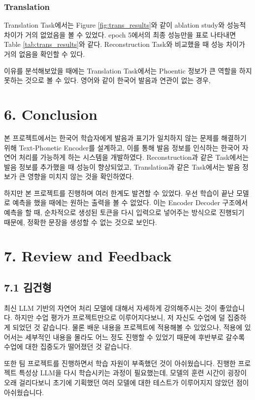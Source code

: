 \documentclass[letterpaper]{article} %
\begin{document}
\subsubsection{Translation}

Translation Task에서는 Figure \ref{fig:trans_results}와 같이 ablation study와 성능적 차이가 거의 없었음을 볼 수 있었다. epoch 5에서의 최종 성능만을 표로 나타내면 Table \ref{tab:trans_results}와 같다. Reconstruction Task와 비교했을 때 성능 차이가 거의 없음을 확인할 수 있다.

이유를 분석해보았을 때에는 Translation Task에서는 Phoentic 정보가 큰 역할을 하지 못하는 것으로 볼 수 있다.
영어와 같이 한국어 발음과 연관이 없는 경우, 



\section{6. Conclusion}
본 프로젝트에서는 한국어 학습자에게 발음과 표기가 일치하지 않는 문제를 해결하기 위해 Text-Phonetic Encoder를 설계하고, 이를 통해 발음 정보를 인식하는 한국어 자연어 처리를 가능하게 하는 시스템을 개발하였다.
Reconstruction과 같은 Task에서는 발음 정보를 추가했을 때 성능이 향상되었고, Translation과 같은 Task에서는 발음 정보가 큰 영향을 미치지 않는 것을 확인하였다.

하지만 본 프로젝트를 진행하며 여러 한계도 발견할 수 있었다. 우선 학습이 끝난 모델로 예측을 했을 때에는 원하는 출력을 볼 수 없었다. 
이는 Encoder Decoder 구조에서 예측을 할 때, 순차적으로 생성된 토큰을 다시 입력으로 넣어주는 방식으로 진행되기 때문에, 정확한 문장을 생성할 수 없는 것으로 보인다.

\section{7. Review and Feedback}
\subsection{7.1 김건형}
최신 LLM 기반의 자연어 처리 모델에 대해서 자세하게 강의해주시는 것이 좋았습니다. 하지만 수업 평가가 프로젝트만으로 이루어지다보니, 저 자신도 수업에 덜 집중하게 되었던 것 같습니다. 물론 배운 내용을 프로젝트에 적용해볼 수 있었으나, 적용에 있어서는 세부적인 내용을 몰라도 어느 정도 진행할 수 있었기 때문에 후반부로 갈수록 수업에 대한 집중도가 떨어졌던 것 같습니다.

또한 팀 프로젝트를 진행하면서 학습 자원이 부족했던 것이 아쉬웠습니다. 진행한 프로젝트 특성상 LLM을 다시 학습시키는 과정이 필요했는데, 모델의 훈련 시간이 굉장이 오래 걸리다보니 초기에 기획했던 여러 모델에 대한 테스트가 이루어지지 않았던 점이 아쉬웠습니다.
\end{document}
